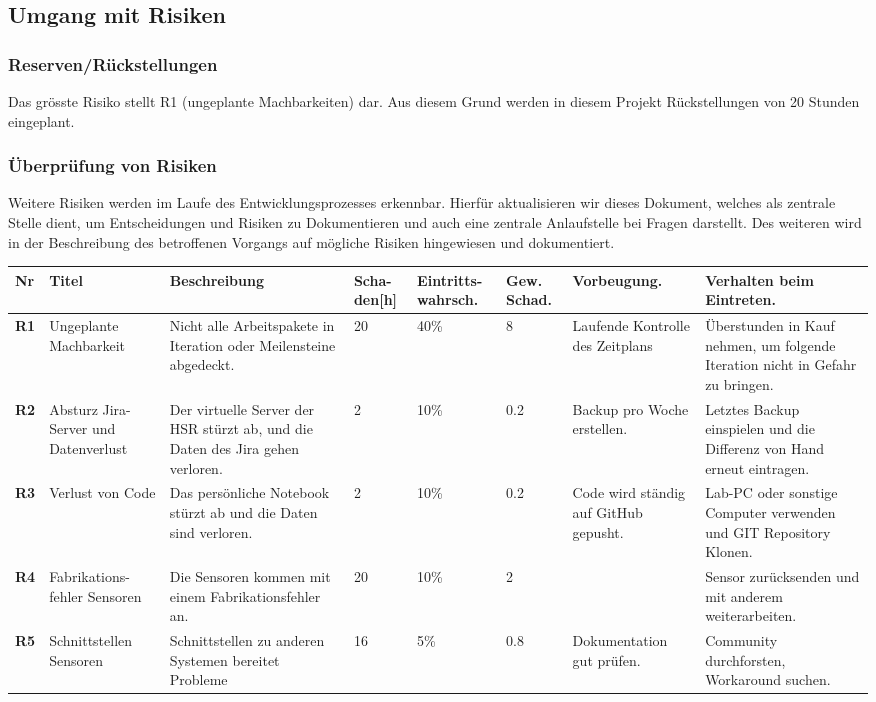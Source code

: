 	\subsection*{Umgang mit Risiken}
		\subsubsection*{Reserven/Rückstellungen}
			Das grösste Risiko stellt R1 (ungeplante Machbarkeiten) dar. Aus diesem Grund werden in diesem Projekt Rückstellungen von 20 Stunden eingeplant.

		\subsubsection*{Überprüfung von Risiken}
			Weitere Risiken werden im Laufe des Entwicklungsprozesses erkennbar. Hierfür aktualisieren wir dieses Dokument, welches als zentrale Stelle dient, 
			um Entscheidungen und Risiken zu Dokumentieren und auch eine zentrale Anlaufstelle bei Fragen darstellt. Des weiteren wird in der Beschreibung des 
			betroffenen Vorgangs auf mögliche Risiken hingewiesen und dokumentiert.
\pagebreak
	
\begin{landscape}
	\begin{tabularx}{\linewidth}{lp{2cm}Xp{1cm}p{1.5cm}p{1.5cm}XX}
		\textbf{Nr}	& \textbf{Titel} & \textbf{Beschreibung} & \textbf{Scha-den[h]} & \textbf{Eintritts-wahrsch.} & \textbf{Gew. Schad.} & \textbf{Vorbeugung.} & \textbf{Verhalten beim Eintreten.}
		\\ \hline
			\textbf{R1} &
			Ungeplante Machbarkeit &
			Nicht alle Arbeitspakete in Iteration oder Meilensteine abgedeckt. &
			20 & 40\% & 8 & Laufende Kontrolle des Zeitplans &
			Überstunden in Kauf nehmen, um folgende Iteration nicht in Gefahr zu bringen.
		\\ \hline
			\textbf{R2} &
			Absturz Jira-Server und Datenverlust &
			Der virtuelle Server der HSR stürzt ab, und die Daten des Jira gehen verloren. &
			2 &
			10\% &
			0.2 &
			Backup pro Woche erstellen. &
			Letztes Backup einspielen und die Differenz von Hand erneut eintragen.
		\\ \hline
			\textbf{R3} &
			Verlust von Code &
			Das persönliche Notebook stürzt ab und die Daten sind verloren. &
			2 &
			10\% &
			0.2 &
			Code wird ständig auf GitHub gepusht. &
			Lab-PC oder sonstige Computer verwenden und GIT Repository Klonen.
		\\ \hline
			\textbf{R4} &
			Fabrikations-fehler Sensoren &
			Die Sensoren kommen mit einem Fabrikationsfehler an. &
			20 &
			10\% &
			2 &
			  &
			Sensor zurücksenden und mit anderem weiterarbeiten.
		\\ \hline
			\textbf{R5} &
			Schnittstellen Sensoren &
			Schnittstellen zu anderen Systemen bereitet Probleme &
			16 &
			5\% &
			0.8 &
			Dokumentation gut prüfen. &
			Community durchforsten, Workaround suchen.
		\\ \hline
	\end{tabularx}
\end{landscape}


